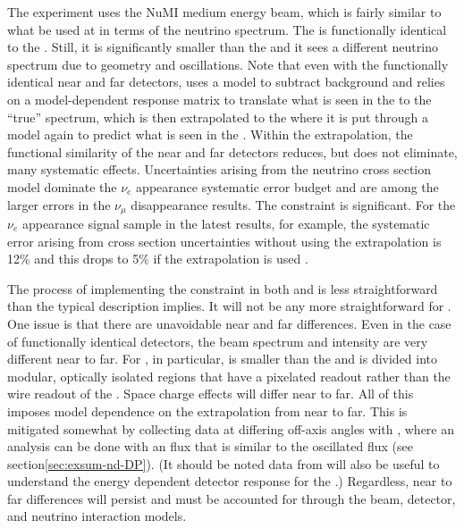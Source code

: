 The    experiment uses the NuMI medium energy beam, which is fairly similar to what be used at  in terms of the neutrino spectrum.  The      is functionally identical to the  .  Still, it is significantly smaller than the   and it sees a different neutrino spectrum due to geometry and oscillations.  Note that even with the functionally identical near and  far detectors,    uses a model to subtract  background and relies on a model-dependent response matrix to translate what is seen in the   to the ``true'' spectrum, which is then extrapolated to the   where it is put through a model again to predict what is seen in the   \cite{NOvA:2018gge, WolcottNUINT2018}.  Within the extrapolation, the functional similarity of the near and  far detectors reduces, but does not eliminate, many systematic effects.  Uncertainties arising from the neutrino cross section model dominate the    $\nu_{e}$ appearance systematic error budget and are among the larger errors in the $\nu_{\mu}$ disappearance results.  The   constraint is significant.  For the $\nu_{e}$ appearance signal sample in the latest    results, for example, the systematic error arising from cross section uncertainties without using the   extrapolation is 12\% and this drops to 5\% if the   extrapolation is used \cite{WolcottNUINT2018}.

The process of implementing the   constraint in both  and    is less straightforward than the typical description implies.  It will not be any more straightforward for .  One issue is that there are unavoidable near and far differences. Even in the case of functionally identical detectors, the beam spectrum and intensity are very different near to far.  For , in particular, 
 is smaller than the  and is divided into modular, optically isolated regions that have a pixelated readout rather than the wire readout of the .  Space charge effects will differ near to far.  All of this imposes model dependence on the extrapolation from near to far.  This is mitigated somewhat by collecting data at differing off-axis angles with , where an analysis can be done with an  flux that is similar to the oscillated  flux (see section\ref{sec:exsum-nd-DP}). (It should be noted data from  will also be useful to understand the energy dependent detector response for the .)  Regardless, near to far differences will persist and must be accounted for through the beam, detector, and neutrino interaction models.  


